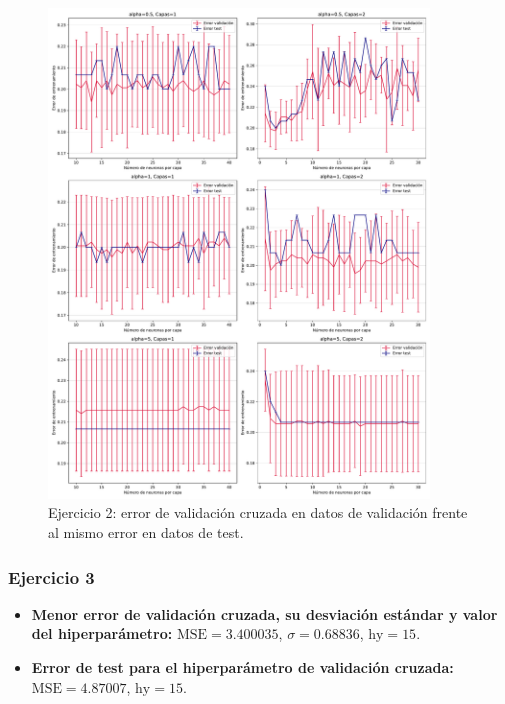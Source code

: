 \documentclass[11pt]{article}
\begin{document}
\begin{itemize}
\begin{figure}[h]
    \includegraphics[width=0.9\textwidth]{fotos/ej2_2.pdf}
    \caption{Ejercicio 2: error de validación cruzada en datos de validación frente al mismo error en datos de test.}
    \end{figure}
\end{itemize}


\subsubsection*{Ejercicio 3}

\begin{itemize}
    \item \textbf{Menor error de validación cruzada, su desviación estándar y valor del hiperparámetro:} $\text{MSE} = 3.400035$, $\sigma = 0.68836$, $\text{hy} = 15$.
    \item \textbf{Error de test para el hiperparámetro de validación cruzada:} $\text{MSE} = 4.87007$, $\text{hy} = 15$.
\end{itemize}
\end{document}
